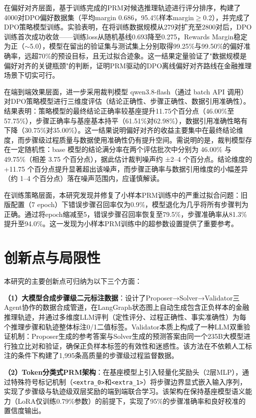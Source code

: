 \documentclass[professional,privacy,print,win,long,STEM,AutoFakeBold]{def/buaa}
\begin{document}
在偏好对齐层面，基于训练完成的PRM对候选推理轨迹进行评分排序，构建了4000对DPO偏好数据集（平均margin 0.686，95.4\%样本margin$\geq$0.2），并完成了DPO策略模型训练。实验表明，在将训练数据规模从279对扩充至2800对后，DPO训练首次成功收敛——训练loss从随机基线0.693降至0.275，Rewards Margin稳定为正（$\sim$5.0），模型在留出的验证集与测试集上分别取得99.25\%与99.50\%的偏好准确率，远超70\%的预设目标，且无过拟合迹象。这一结果定量验证了"数据规模是偏好对齐的关键瓶颈"的判断，证明PRM驱动的DPO离线偏好对齐路线在金融推理场景下切实可行。

在端到端效果层面，进一步采用裁判模型 qwen3.8-flash（通过 batch API 调用）对DPO策略模型进行三维度评估（结论正确性、步骤正确性、数据引用准确性）。结果表明：策略模型的最终结论正确率较基座提升11.75个百分点（46.00\%至57.75\%），步骤正确率与基座基本持平（61.51\%对62.98\%），数据引用准确性略有下降（30.75\%对35.00\%）。这一结果说明偏好对齐的收益主要集中在最终结论维度，而步骤级过程质量与数据使用准确性仍有提升空间。需说明的是，裁判模型存在一定随机性：base 模型的结论满分率在两个评估批次中分别为 46.00\% 与 49.75\%（相差 3.75 个百分点），据此估计裁判噪声约 ±2--4 个百分点。结论维度的 +11.75 个百分点提升显著超出该噪声，而步骤正确率与数据引用维度的小幅差异（约 1--4 个百分点）落在噪声范围内，应谨慎解读。

在训练策略层面，本研究发现并修复了小样本PRM训练中的严重过拟合问题：旧版配置（7 epoch）下错误步骤召回率仅为0.9\%，模型退化为几乎将所有步骤判为正确。通过将epoch缩减至5，错误步骤召回率恢复至79.5\%，步骤准确率从81.3\%提升至94.0\%。这一发现为小样本PRM训练中的超参数设置提供了重要参考。

\section{创新点与局限性}

本研究的主要创新点可归纳为以下三个方面：

\textbf{（1）大模型合成步骤级二元标注数据}：设计了Proposer→Solver→Validator三Agent协作的数据合成管道，在LangGraph状态图上自动生成包含正负样本的金融推理轨迹，并通过多维度LLM评判（定性评分、过程正确性、事实准确性）为每个推理步骤和轨迹整体标注0/1二值标签。Validator本质上构成了一种LLM双重验证机制：Proposer生成的参考答案与Solver生成的预测答案由同一个235B大模型进行独立比对和验证，确保正负样本标签的有效性和迷惑性。该方法在不依赖人工标注的条件下构建了1,995条高质量的步骤级过程监督数据。

\textbf{（2）Token分类式PRM架构}：在基座模型上引入轻量化奖励头（2层MLP），通过特殊符号标记机制（\texttt{<extra\_0>}和\texttt{<extra\_1>}）将步骤边界显式嵌入输入序列，实现了步骤级与轨迹级双层奖励的端到端联合学习。该架构在保持基座模型语义能力（LoRA仅训练0.79\%参数）的前提下，实现了95\%的步骤准确率和良好校准的置信度输出。
\end{document}
